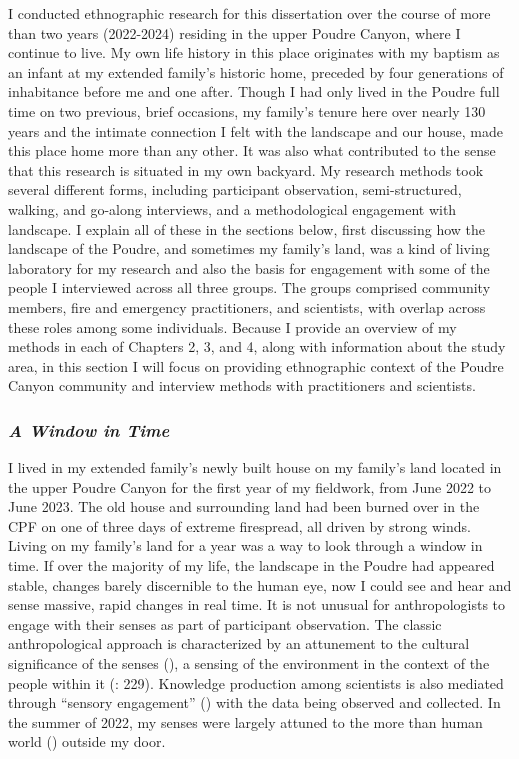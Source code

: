 \documentclass[
]{article}
\begin{document}
I conducted ethnographic research for this dissertation over the course of more than two years (2022-2024) residing in the upper Poudre Canyon, where I continue to live. My own life history in this place originates with my baptism as an infant at my extended family's historic home, preceded by four generations of inhabitance before me and one after. Though I had only lived in the Poudre full time on two previous, brief occasions, my family's tenure here over nearly 130 years and the intimate connection I felt with the landscape and our house, made this place home more than any other. It was also what contributed to the sense that this research is situated in my own backyard. My research methods took several different forms, including participant observation, semi-structured, walking, and go-along interviews, and a methodological engagement with landscape. I explain all of these in the sections below, first discussing how the landscape of the Poudre, and sometimes my family's land, was a kind of living laboratory for my research and also the basis for engagement with some of the people I interviewed across all three groups. The groups comprised community members, fire and emergency practitioners, and scientists, with overlap across these roles among some individuals. Because I provide an overview of my methods in each of Chapters 2, 3, and 4, along with information about the study area, in this section I will focus on providing ethnographic context of the Poudre Canyon community and interview methods with practitioners and scientists.

\subsubsection{\texorpdfstring{\emph{A Window in Time}}{A Window in Time}}\label{a-window-in-time}

I lived in my extended family's newly built house on my family's land located in the upper Poudre Canyon for the first year of my fieldwork, from June 2022 to June 2023. The old house and surrounding land had been burned over in the CPF on one of three days of extreme firespread, all driven by strong winds. Living on my family's land for a year was a way to look through a window in time. If over the majority of my life, the landscape in the Poudre had appeared stable, changes barely discernible to the human eye, now I could see and hear and sense massive, rapid changes in real time. It is not unusual for anthropologists to engage with their senses as part of participant observation. The classic anthropological approach is characterized by an attunement to the cultural significance of the senses (), a sensing of the environment in the context of the people within it (: 229). Knowledge production among scientists is also mediated through ``sensory engagement'' () with the data being observed and collected. In the summer of 2022, my senses were largely attuned to the more than human world () outside my door.
\end{document}
